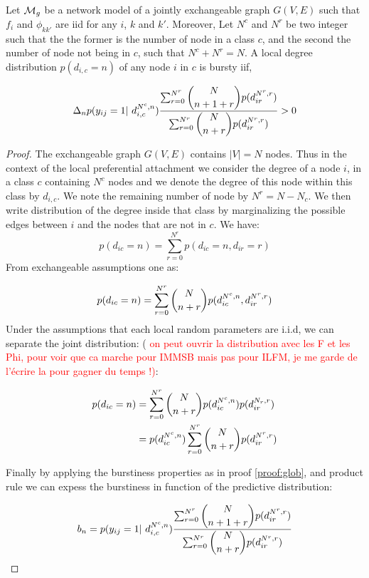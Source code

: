 \begin{theorem} \label{th:burst_local}
	Let $\mathcal{M}_g$ be a network model of a jointly exchangeable graph $G(V,E)$ such that $f_i$ and $\phi_{kk'}$ are iid for any $i$, $k$ and $k'$. Moreover,  Let $N^c$ and $N^r$ be two integer such that the the former is the number of node in a class $c$, and the second the number of node not being in $c$, such that $N^c+N^r = N$. A local degree distribution $p(d_{i,c}=n)$ of any node $i$ in $c$ is bursty iif,
	
	\begin{equation}
\Delta_n  p(y_{ij}=1 | d_{i,c}^{N^c,n}) \frac{\sum_{r=0}^{N^r}\dbinom{N}{n+1+r} p(d_{ir}^{N^r,r})}{\sum_{r=0}^{N^r} \dbinom{N}{n+r} p(d_{ir}^{N^r,r}) } > 0
	\end{equation}
	
	
\end{theorem}

\begin{proof}
The exchangeable graph $G(V,E)$ contains $|V|=N$ nodes. Thus in the context of the local preferential attachment we consider the degree of a node $i$, in a class $c$ containing $N^c$ nodes and we denote the degree of this node within this class by $d_{i,c}$. We note the remaining number of node by $N^r = N - N_c$. We then write  distribution of the degree inside that class by marginalizing the possible edges between $i$ and the nodes that are not in $c$. We have:
\begin{equation}
p(d_{ic}=n) = \sum_{r=0}^{N^r} p(d_{ic}=n,d_{ir}=r)
\end{equation}
From exchangeable assumptions one as:

\begin{equation}
p(d_{ic}=n) = \sum_{r=0}^{N^r} \dbinom{N}{n+r} p(d_{ic}^{N^c, n},d_{ir}^{N^r, r})
\end{equation}
Under the assumptions that each local random parameters are i.i.d, we can separate the joint distribution: ( \textcolor{red}{on peut ouvrir la distribution avec les F et les Phi, pour voir que ca marche pour IMMSB mais pas pour ILFM, je me garde de l'écrire la pour gagner du temps !)}: 

\begin{align}
p(d_{ic}=n) &= \sum_{r=0}^{N^r} \dbinom{N}{n+r} p(d_{ic}^{N^c, n}) p(d_{ir}^{N_r, r}) \\
 &=  p(d_{ic}^{N^c, n})\sum_{r=0}^{N^r}   \dbinom{N}{n+r} p(d_{ir}^{N^r, r})
\end{align}

Finally by applying the burstiness properties as in proof \ref{proof:glob}, and product rule we can expess the burstiness in function of the predictive distribution:

\begin{equation} \label{eq:29}
b_n =  p(y_{ij}=1 | d_{i,c}^{N^c,n}) \frac{\sum_{r=0}^{N^r}\dbinom{N}{n+1+r} p(d_{ir}^{N^r,r})}{\sum_{r=0}^{N^r} \dbinom{N}{n+r} p(d_{ir}^{N^r,r}) }
\end{equation}

\end{proof}

